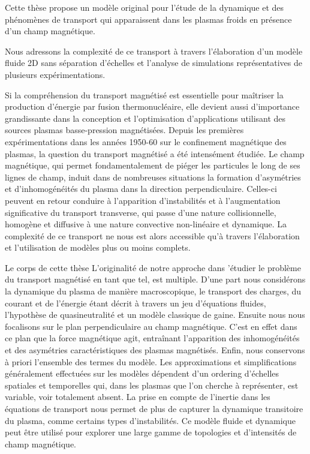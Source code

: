 
Cette thèse propose un modèle original pour l'étude de la dynamique et des
		phénomènes de transport qui apparaissent dans les plasmas froids en présence
		d'un champ magnétique. 
		
		Nous adressons la complexité de ce transport à travers l’élaboration d'un
		modèle fluide 2D sans séparation d'échelles et l'analyse de simulations
		représentatives de plusieurs expérimentations.
			
		Si la compréhension du transport magnétisé est essentielle pour maîtriser la
		production d'énergie par fusion thermonucléaire, elle devient aussi d'importance
		grandissante dans la conception et l'optimisation d'applications utilisant des
		sources plasmas basse-pression magnétisées.
		Depuis les premières expérimentations dans les années 1950-60 sur le confinement
		magnétique des plasmas, la question du transport magnétisé a été intensément
		étudiée. Le champ magnétique, qui permet fondamentalement de piéger les
		particules le long de ses lignes de champ, induit dans de nombreuses situations la formation
		d'asymétries et d'inhomogénéités du plasma dans la direction perpendiculaire.
		Celles-ci peuvent en retour conduire à l'apparition d'instabilités et à
		l'augmentation significative du transport transverse, qui passe d'une nature
		collisionnelle, homogène et diffusive à une nature convective non-linéaire et
		dynamique. La complexité de ce transport ne nous est alors accessible qu'à
		travers l'élaboration et l'utilisation de modèles plus ou moins complets.
				
		Le corps de cette thèse L'originalité de notre approche dans
		'étudier le problème du transport magnétisé en tant que tel,  est multiple.
		D'une part nous considérons la dynamique du plasma de manière macroscopique, le
		transport des charges, du courant et de l'énergie étant décrit à travers un jeu
		d'équations fluides, l'hypothèse de quasineutralité et un modèle classique de
		gaine.
		Ensuite nous nous focalisons sur le plan perpendiculaire au champ magnétique.
		C'est en effet dans ce plan que la force magnétique agit, entraînant
		l'apparition des inhomogénéités et des asymétries caractéristiques des plasmas
		magnétisés.
		Enfin, nous conservons à priori l'ensemble des termes du modèle.
		Les approximations et simplifications généralement effectuées sur les
		modèles dépendent d'un ordering d'échelles spatiales et temporelles qui, dans
		les plasmas que l'on cherche à représenter, est variable, voir totalement
		absent.
		La prise en compte de l'inertie dans les équations de transport nous permet de
		plus de capturer la dynamique transitoire du plasma, comme certains types
		d'instabilités. Ce modèle fluide et dynamique peut être utilisé pour explorer
		une large gamme de topologies et d'intensités de champ magnétique.
				
